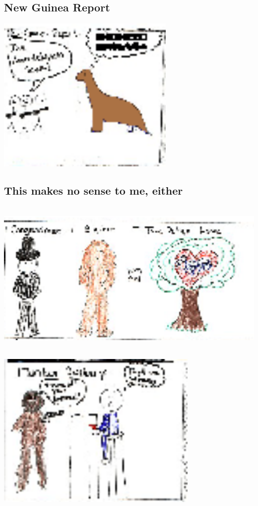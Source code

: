 \documentclass[10pt]{article}
\begin{document}
\subsection*{New Guinea Report}
\includegraphics[height = 3in]{panel.2004-03-12.08.eps}

\subsection*{This makes no sense to me, either}
\includegraphics[height = 3in]{panel.2004-03-12.09.eps}

\includegraphics[height = 3in]{panel.2004-03-12.10.eps}
\end{document}
